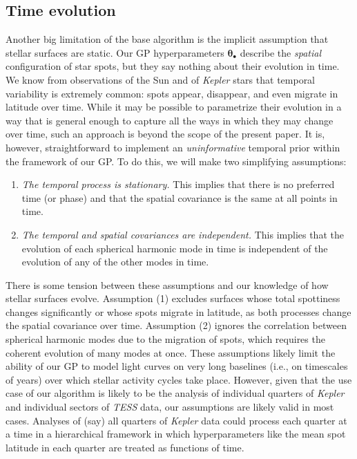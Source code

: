 \documentclass[modern]{aastex62}
\begin{document}
\subsection{Time evolution}
\label{sec:temporal}

Another big limitation of the base algorithm is the implicit assumption that
stellar surfaces are static. Our GP hyperparameters $\pmb{\theta}_\bullet$
describe the \emph{spatial} configuration of star spots, but they say nothing
about their evolution in time. We know from observations of the Sun and of
\emph{Kepler} stars that temporal variability is extremely common: spots appear,
disappear, and even migrate in latitude over time. While it may be possible to
parametrize their evolution in a way that is general enough to capture all the
ways in which they may change over time, such an approach is beyond the scope
of the present paper. It is, however, straightforward to implement an
\emph{uninformative} temporal prior within the framework of our GP. To do this,
we will make two simplifying assumptions:

\begin{enumerate}
    \item \emph{The temporal process is stationary.} This implies that there is no
          preferred time (or phase) and that the spatial covariance is the
          same at all points in time.
    \item \emph{The temporal and spatial covariances are independent.} This implies
          that the evolution of each spherical harmonic mode in time is independent of the
          evolution of any of the other modes in time.
\end{enumerate}

There is some tension between these assumptions and our knowledge of how stellar
surfaces evolve. Assumption (1) excludes surfaces whose total spottiness changes
significantly
or whose spots migrate in latitude, as both processes change the spatial covariance
over time. Assumption (2) ignores the correlation between spherical harmonic modes
due to the migration of spots, which requires the coherent evolution of many
modes at once. These assumptions likely limit the ability of our GP to model
light curves on very long baselines (i.e., on timescales of years) over which
stellar activity cycles take place. However, given that the use case of our
algorithm is likely to be the analysis of individual quarters of \emph{Kepler}
and individual sectors of \emph{TESS} data,
our assumptions are likely valid in most cases. Analyses of (say) all quarters of
\emph{Kepler} data could process each quarter at a time in a hierarchical
framework in which hyperparameters like the mean spot latitude in each quarter
are treated as functions of time.
\end{document}
